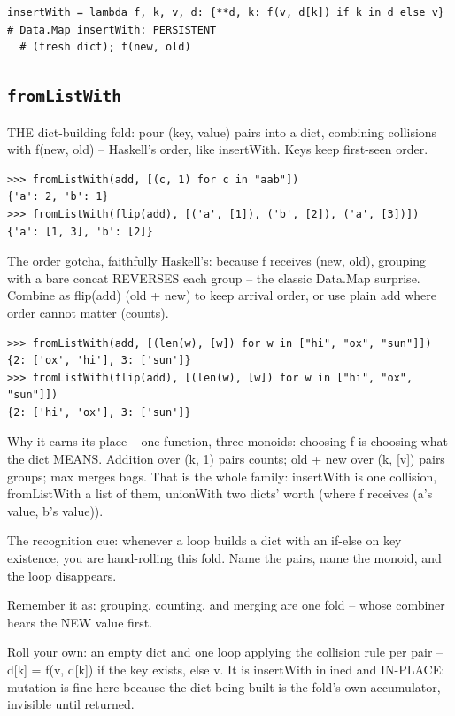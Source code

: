 \documentclass[10pt,letterpaper]{book}
\begin{document}
\begin{lstlisting}[style=ex]
insertWith = lambda f, k, v, d: {**d, k: f(v, d[k]) if k in d else v}  # Data.Map insertWith: PERSISTENT
  # (fresh dict); f(new, old)
\end{lstlisting}
\subsection{\texttt{fromListWith}}\label{def:fromListWith}
THE dict-building fold: pour (key, value) pairs into a dict, combining collisions with f(new, old) -- Haskell's order, like insertWith. Keys keep first-seen order.
\begin{lstlisting}[style=ex]
>>> fromListWith(add, [(c, 1) for c in "aab"])
{'a': 2, 'b': 1}
>>> fromListWith(flip(add), [('a', [1]), ('b', [2]), ('a', [3])])
{'a': [1, 3], 'b': [2]}
\end{lstlisting}

The order gotcha, faithfully Haskell's: because f receives (new, old), grouping with a bare concat REVERSES each group -- the classic Data.Map surprise. Combine as flip(add) (old + new) to keep arrival order, or use plain add where order cannot matter (counts).

\begin{lstlisting}[style=ex]
>>> fromListWith(add, [(len(w), [w]) for w in ["hi", "ox", "sun"]])
{2: ['ox', 'hi'], 3: ['sun']}
>>> fromListWith(flip(add), [(len(w), [w]) for w in ["hi", "ox", "sun"]])
{2: ['hi', 'ox'], 3: ['sun']}
\end{lstlisting}

Why it earns its place -- one function, three monoids: choosing f is choosing what the dict MEANS. Addition over (k, 1) pairs counts; old + new over (k, [v]) pairs groups; max merges bags. That is the whole family: insertWith is one collision, fromListWith a list of them, unionWith two dicts' worth (where f receives (a's value, b's value)).


The recognition cue: whenever a loop builds a dict with an if-else on key existence, you are hand-rolling this fold. Name the pairs, name the monoid, and the loop disappears.


Remember it as: grouping, counting, and merging are one fold -- whose combiner hears the NEW value first.


Roll your own: an empty dict and one loop applying the collision rule per pair -- d[k] = f(v, d[k]) if the key exists, else v. It is insertWith inlined and IN-PLACE: mutation is fine here because the dict being built is the fold's own accumulator, invisible until returned.
\end{document}
